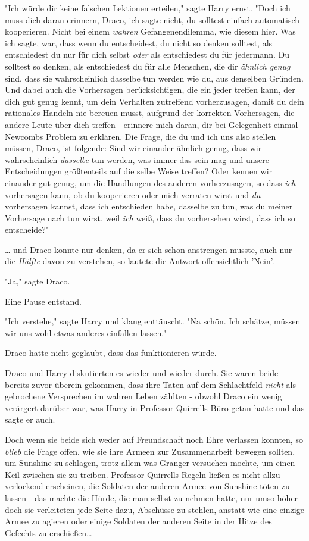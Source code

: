 {"Ich würde dir keine falschen Lektionen erteilen," sagte Harry ernst. "Doch ich muss dich daran erinnern, Draco, ich sagte nicht, du solltest einfach automatisch kooperieren. Nicht bei einem \emph{wahren} Gefangenendilemma, wie diesem hier. Was ich sagte, war, dass wenn du entscheidest, du nicht so denken solltest, als entschiedest du nur für dich selbst \emph{oder} als entschiedest du für jedermann. Du solltest so denken, als entschiedest du für alle Menschen, die dir \emph{ähnlich genug} sind, dass sie wahrscheinlich dasselbe tun werden wie du, aus denselben Gründen. Und dabei auch die Vorhersagen berücksichtigen, die ein jeder treffen kann, der dich gut genug kennt, um dein Verhalten zutreffend vorherzusagen, damit du dein rationales Handeln nie bereuen musst, aufgrund der korrekten Vorhersagen, die andere Leute über dich treffen - erinnere mich daran, dir bei Gelegenheit einmal Newcombs Problem zu erklären. Die Frage, die du und ich uns also stellen müssen, Draco, ist folgende: Sind wir einander ähnlich genug, dass wir wahrscheinlich \emph{dasselbe} tun werden, was immer das sein mag und unsere Entscheidungen größtenteils auf die selbe Weise treffen? Oder kennen wir einander gut genug, um die Handlungen des anderen vorherzusagen, so dass \emph{ich} vorhersagen kann, ob du kooperieren oder mich verraten wirst und \emph{du} vorhersagen kannst, dass ich entschieden habe, dasselbe zu tun, was du meiner Vorhersage nach tun wirst, weil \emph{ich} weiß, dass du vorhersehen wirst, dass ich so entscheide?"

… und Draco konnte nur denken, da er sich schon anstrengen musste, auch nur die \emph{Hälfte} davon zu verstehen, so lautete die Antwort offensichtlich 'Nein'.

"Ja," sagte Draco.

Eine Pause entstand.

"Ich verstehe," sagte Harry und klang enttäuscht. "Na schön. Ich schätze, müssen wir uns wohl etwas anderes einfallen lassen."

Draco hatte nicht geglaubt, dass das funktionieren würde.

Draco und Harry diskutierten es wieder und wieder durch. Sie waren beide bereits zuvor überein gekommen, dass ihre Taten auf dem Schlachtfeld \emph{nicht} als gebrochene Versprechen im wahren Leben zählten - obwohl Draco ein wenig verärgert darüber war, was Harry in Professor Quirrells Büro getan hatte und das sagte er auch.

Doch wenn sie beide sich weder auf Freundschaft noch Ehre verlassen konnten, so \emph{blieb} die Frage offen, wie sie ihre Armeen zur Zusammenarbeit bewegen sollten, um Sunshine zu schlagen, trotz allem was Granger versuchen mochte, um einen Keil zwischen sie zu treiben. Professor Quirrells Regeln ließen es nicht allzu verlockend erscheinen, die Soldaten der anderen Armee von Sunshine töten zu lassen - das machte die Hürde, die man selbst zu nehmen hatte, nur umso höher - doch sie verleiteten jede Seite dazu, Abschüsse zu stehlen, anstatt wie eine einzige Armee zu agieren oder einige Soldaten der anderen Seite in der Hitze des Gefechts zu erschießen…

}
